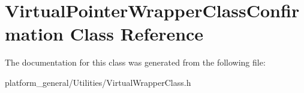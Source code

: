 \hypertarget{classVirtualPointerWrapperClassConfirmation}{\section{\-Virtual\-Pointer\-Wrapper\-Class\-Confirmation \-Class \-Reference}
\label{classVirtualPointerWrapperClassConfirmation}
}


\-The documentation for this class was generated from the following file\-:\begin{DoxyCompactItemize}
\item 
platform\-\_\-general/\-Utilities/\-Virtual\-Wrapper\-Class.\-h\end{DoxyCompactItemize}
